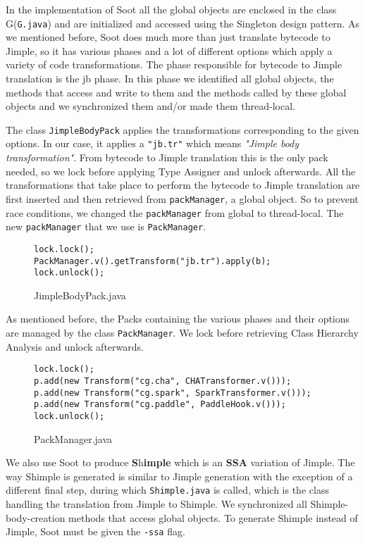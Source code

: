 \documentclass{dithesis}
\begin{document}
    In the implementation of Soot all the global objects are enclosed in the class G(\texttt{G.java}) and are initialized and accessed using the Singleton design pattern. As we mentioned before, Soot does much more than just translate bytecode to Jimple, so it has various phases and a lot of different options which apply a variety of code transformations. The phase responsible for bytecode to Jimple translation is the jb phase. In this phase we identified all global objects, the methods that access and write to them and the methods called by these global objects and we synchronized them and/or made them thread-local.

	    	The class \texttt{JimpleBodyPack} applies the transformations corresponding to the given options. In our case, it applies a \texttt{"jb.tr"} which means \textit{"Jimple body transformation"}. From bytecode to Jimple translation this is the only pack needed, so we lock before applying Type Assigner and unlock afterwards. All the transformations that take place to perform the bytecode to Jimple translation are first inserted and then retrieved from \texttt{packManager}, a global object. So to prevent race conditions, we changed the \texttt{packManager} from global to thread-local. The new \texttt{packManager} that we use is \texttt{PackManager}.
	    	\begin{figure}[H]
\begin{lstlisting}
lock.lock();
PackManager.v().getTransform("jb.tr").apply(b);
lock.unlock();
\end{lstlisting}
	        \caption{JimpleBodyPack.java}
	        \end{figure}

	    	As mentioned before, the Packs containing the various phases and their options are managed by the class \texttt{PackManager}. We lock before retrieving Class Hierarchy Analysis and unlock afterwards.
			\begin{figure}[H]
\begin{lstlisting}
lock.lock();
p.add(new Transform("cg.cha", CHATransformer.v()));
p.add(new Transform("cg.spark", SparkTransformer.v()));
p.add(new Transform("cg.paddle", PaddleHook.v()));
lock.unlock();
\end{lstlisting}
	        \caption{PackManager.java}
	        \end{figure}

	    	We also use Soot to produce \textbf{S}h\textbf{imple} which is an \textbf{SSA} variation of Jimple. The way Shimple is generated is similar to Jimple generation with the exception of a different final step, during which \texttt{Shimple.java} is called, which is the class handling the translation from Jimple to Shimple. We synchronized all Shimple-body-creation methods that access global objects. To generate Shimple instead of Jimple, Soot must be given the \texttt{-ssa} flag.
\end{document}
